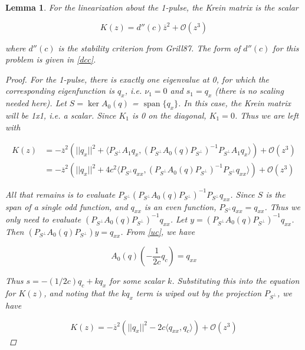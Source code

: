 \documentclass[12pt]{article}
\DeclareMathOperator{\spn}{span}
\newtheorem{lemma}{Lemma}
\begin{document}
\begin{lemma}\label{Krein1pulse}
For the linearization about the 1-pulse, the Krein matrix is the scalar

\begin{equation}
K(z) = d''(c) \overline{z}^2 + \mathcal{O}(z^3)
\end{equation}

where $d''(c)$ is the stability criterion from Grill87. The form of $d''(c)$ for this problem is given in \eqref{dcc}.

\begin{proof}

For the 1-pulse, there is exactly one eigenvalue at 0, for which the corresponding eigenfunction is $q_x$, i.e. $\nu_1 = 0$ and $s_1 = q_x$ (there is no scaling needed here). Let $S = \ker A_0(q)$ = $\spn \{q_x\}$. In this case, the Krein matrix will be 1x1, i.e. a scalar. Since $K_1$ is 0 on the diagonal, $K_1 = 0$. Thus we are left with

\begin{align*}
K(z) &= -\overline{z}^2 \left( ||q_x||^2 + \langle P_{S^\perp} A_1 q_x, (P_{S^\perp} A_0(q) P_{S^\perp})^{-1} P_{S^\perp} A_1 q_x \rangle \right) + \mathcal{O}(z^3) \\
&= -\overline{z}^2 \left( ||q_x||^2 + 4 c^2 \langle P_{S^\perp} q_{xx}, (P_{S^\perp} A_0(q) P_{S^\perp})^{-1} P_{S^\perp} q_{xx} \rangle \right) + \mathcal{O}(z^3)
\end{align*}

All that remains is to evaluate $P_{S^\perp} (P_{S^\perp} A_0(q) P_{S^\perp})^{-1} P_{S^\perp} q_{xx}$. Since $S$ is the span of a single odd function, and $q_{xx}$ is an even function, $P_{S^\perp} q_{xx} = q_{xx}$. Thus we only need to evaluate $(P_{S^\perp} A_0(q) P_{S^\perp})^{-1} q_{xx}$. Let $y = (P_{S^\perp} A_0(q) P_{S^\perp})^{-1} q_{xx}$. Then $(P_{S^\perp} A_0(q) P_{S^\perp})y = q_{xx}$. From \eqref{uc}, we have

\begin{equation*}\label{uc}
A_0(q) \left( -\frac{1}{2c} q_c \right) = q_{xx}
\end{equation*}

Thus $s = -(1/2c) q_c + k q_x$ for some scalar $k$. Substituting this into the equation for $K(z)$, and noting that the $k q_x$ term is wiped out by the projection $P_{S^\perp}$, we have

\[
K(z) = -\overline{z}^2 \left( ||q_x||^2 - 2c \langle q_{xx}, q_c \rangle \right) + \mathcal{O}(z^3)
\]


\end{proof}
\end{lemma}
\end{document}

